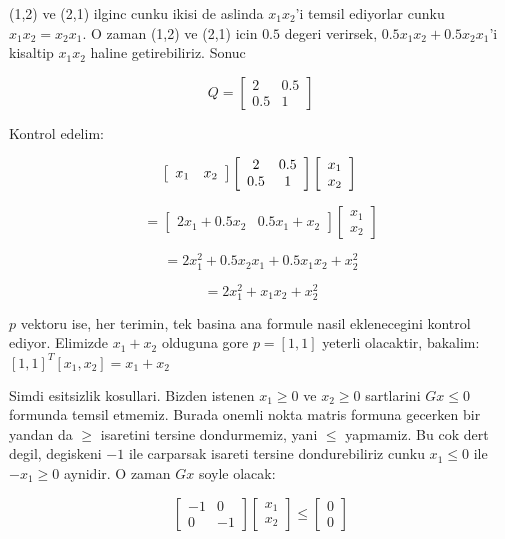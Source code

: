 \documentclass[12pt,fleqn]{article}\usepackage{../common}
\begin{document}
(1,2) ve (2,1) ilginc cunku ikisi de aslinda $x_1x_2$'i temsil
ediyorlar cunku $x_1x_2 = x_2x_1$. O zaman (1,2) ve (2,1) icin $0.5$
degeri verirsek, $0.5x_1x_2 + 0.5x_2x_1$'i kisaltip $x_1x_2$ haline
getirebiliriz. Sonuc

\[ 
Q = \left[ \begin{array}{cc}
    2 & 0.5 \\
    0.5 & 1
\end{array} \right]
 \]

Kontrol edelim:

\[ 
 \left[ \begin{array}{cc}
    x_1 & x_2 
\end{array} \right]
\left[ \begin{array}{cc}
    2 & 0.5 \\
    0.5 & 1
\end{array} \right]
\left[ \begin{array}{c}
    x_1 \\
    x_2 
\end{array} \right] \\
 \]

\[ 
= \left[ \begin{array}{cc}
    2x_1 + 0.5x_2 & 0.5x_1 + x_2 
\end{array} \right]
\left[ \begin{array}{c}
    x_1 \\
    x_2 
\end{array} \right] 
 \]

\[ = 2x_1^2 + 0.5x_2x_1 + 0.5x_1x_2 + x_2^2  \]

\[ = 2x_1^2 + x_1x_2 + x_2^2  \]

$p$ vektoru ise, her terimin, tek basina ana formule nasil eklenecegini kontrol
ediyor. Elimizde $x_1 + x_2$ olduguna gore $p = [1, 1]$ yeterli olacaktir,
bakalim: $[1, 1]^T[x_1, x_2] = x_1 + x_2$

Simdi esitsizlik kosullari. Bizden istenen $x_1 \geq 0$ ve $x_2 \geq 0$
sartlarini $Gx \leq 0$ formunda temsil etmemiz. Burada onemli nokta matris
formuna gecerken bir yandan da $\geq$ isaretini tersine dondurmemiz, yani $\leq$
yapmamiz. Bu cok dert degil, degiskeni $-1$ ile carparsak isareti tersine
dondurebiliriz cunku $x_1 \leq 0$ ile $-x_1 \geq 0$ aynidir. O zaman $Gx$ soyle
olacak: 

\[ 
\left[ \begin{array}{cc}
    -1 & 0 \\
    0 & -1
\end{array} \right]
\left[ \begin{array}{c}
    x_1 \\
    x_2
\end{array} \right]
\leq
\left[ \begin{array}{c}
    0 \\
    0
\end{array} \right]
 \]
\end{document}
